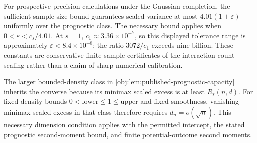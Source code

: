 For prospective precision calculations under the Gaussian completion, the sufficient sample-size bound guarantees scaled variance at most \(4.01(1+\varepsilon)\) uniformly over the prognostic class. The necessary bound applies when \(0<\varepsilon<c_s/4.01\). At \(s=1\), \(c_1\approx3.36\times10^{-7}\), so this displayed tolerance range is approximately \(\varepsilon<8.4\times10^{-8}\); the ratio \(3072/c_1\) exceeds nine billion. These constants are conservative finite-sample certificates of the interaction-count scaling rather than a claim of sharp numerical calibration.

The larger bounded-density class in \cref{obj:lem:published-prognostic-capacity} inherits the converse because its minimax scaled excess is at least \(R_s(n,d)\). For fixed density bounds \(0<\mathrm{lower}\leq1\leq\mathrm{upper}\) and fixed smoothness, vanishing minimax scaled excess in that class therefore requires \(d_n=o(\sqrt n)\). This necessary dimension condition applies with the permitted intercept, the stated prognostic second-moment bound, and finite potential-outcome second moments.
